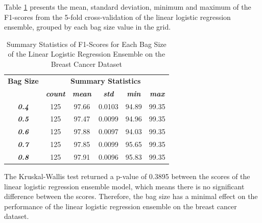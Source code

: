 \documentclass[10pt, conference]{IEEEtran}
\begin{document}
Table \ref{table: BC_bagsize_linear_performance_metrics} presents the mean, standard deviation, minimum and maximum of the
F1-scores from the 5-fold cross-validation of the linear logistic regression ensemble, grouped by each bag size
value in the grid.
\begin{table}[H]
    \caption{Summary Statistics of F1-Scores for Each Bag Size of the Linear Logistic Regression Ensemble on the Breast Cancer Dataset}
    \begin{center}
        \begin{tabular}{|c||c|c|c|c|c|}
            \hline
            \textbf{Bag Size}&\multicolumn{5}{|c|}{\textbf{Summary Statistics}} \\
            \cline{2-6}
                       &\textbf{\textit{count}} & \textbf{\textit{mean}} & \textbf{\textit{std}} & \textbf{\textit{min}} & \textbf{\textit{max}}\\
            \hline
            \textbf{\textit{0.4}} & 125 & 97.66 & 0.0103 & 94.89 & 99.35\\
            \textbf{\textit{0.5}} & 125 & 97.47 & 0.0099 & 94.96 & 99.35\\
            \textbf{\textit{0.6}} & 125 & 97.88 & 0.0097 & 94.03 & 99.35\\
            \textbf{\textit{0.7}} & 125 & 97.85 & 0.0099 & 95.65 & 99.35\\
            \textbf{\textit{0.8}} & 125 & 97.91 & 0.0096 & 95.83 & 99.35\\
            \hline
        \end{tabular}
    \end{center}
    \label{table: BC_bagsize_linear_performance_metrics}
\end{table}
The Kruskal-Wallis test returned a p-value of 0.3895 between the scores of the linear logistic regression ensemble model,
which means there is no significant difference between the scores. Therefore, the bag size has a minimal effect on the
performance of the linear logistic regression ensemble on the breast cancer dataset.
\end{document}
